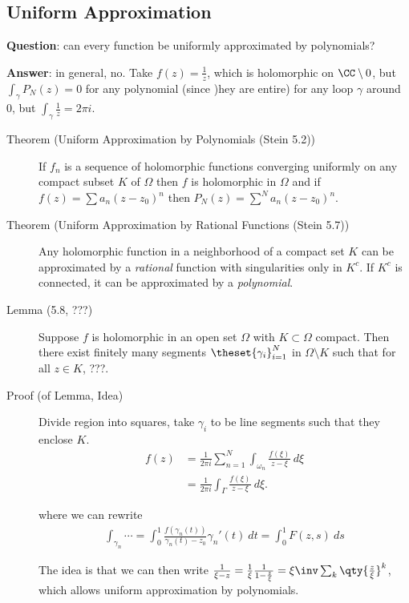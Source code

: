 \hypertarget{uniform-approximation}{%
\subsection{Uniform Approximation}\label{uniform-approximation}}

\textbf{Question}: can every function be uniformly approximated by
polynomials?

\textbf{Answer}: in general, no. Take \(f(z) = \frac 1 z\), which is
holomorphic on \(\CC \setminus 0\), but \(\int_\gamma P_N(z) = 0\) for
any polynomial (since )hey are entire) for any loop \(\gamma\) around 0,
but \(\int_\gamma \frac 1 z = 2\pi i\).

\begin{description}
\item[Theorem (Uniform Approximation by Polynomials (Stein 5.2))]
If \(f_n\) is a sequence of holomorphic functions converging uniformly
on any compact subset \(K\) of \(\Omega\) then \(f\) is holomorphic in
\(\Omega\) and if \(f(z) = \sum a_n (z- z_0)^n\) then
\(P_N(z) = \sum^N a_n (z-z_0)^n\).
\item[Theorem (Uniform Approximation by Rational Functions (Stein 5.7))]
Any holomorphic function in a neighborhood of a compact set \(K\) can be
approximated by a \emph{rational} function with singularities only in
\(K^c\). If \(K^c\) is connected, it can be approximated by a
\emph{polynomial}.
\item[Lemma (5.8, ???)]
Suppose \(f\) is holomorphic in an open set \(\Omega\) with
\(K\subset \Omega\) compact. Then there exist finitely many segments
\(\theset{\gamma_i}_{i=1}^N\) in \(\Omega\setminus K\) such that for all
\(z\in K\), ???.
\item[Proof (of Lemma, Idea)]
Divide region into squares, take \(\gamma_i\) to be line segments such
that they enclose \(K\). \begin{align*}
f(z) 
&= \frac{1}{2\pi i} \sum_{n=1}^N \int_{\omega_n} \frac{f(\xi)}{z-\xi} ~d\xi \\
&= \frac{1}{2\pi i} \int_{\Gamma} \frac{f(\xi)}{z-\xi} ~d\xi
.\end{align*}

where we can rewrite
\begin{align*}
\int_{\gamma_n} \cdots = \int_0^1 \frac{f(\gamma_n(t))}{\gamma_n(t) - z_0} \gamma_n'(t) ~dt = \int_0^1 F(z, s) ~ds
\end{align*}

The idea is that we can then write
\(\frac 1 {\xi - z} = \frac 1 \xi \frac 1 {1-\frac{z}{\xi}} = \xi\inv \sum_k \qty{\frac{z}{\xi}}^k\),
which allows uniform approximation by polynomials.
\end{description}


